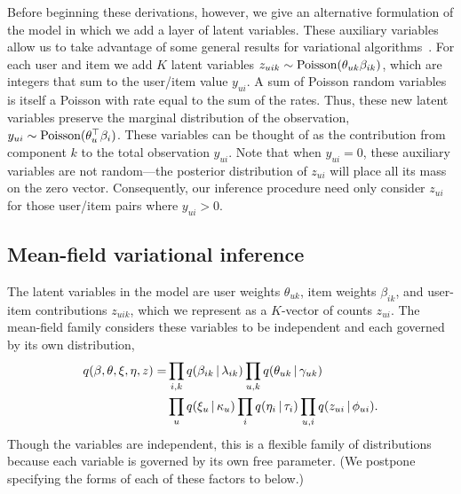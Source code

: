 \documentclass{sig-alternate}
\begin{document}

Before beginning these derivations, however, we give an alternative
formulation of the model in which we add a layer of latent variables.
These auxiliary variables allow us to take advantage of some general
results for variational
algorithms~\cite{Ghahramani:2001,Hoffman:2013}.  For each user and
item we add $K$ latent variables $z_{uik} \sim \textrm{Poisson}(\theta_{uk}
\beta_{ik})$, which are integers that sum to the user/item value
$y_{ui}$.  A sum of Poisson random variables is itself a Poisson with
rate equal to the sum of the rates.  Thus, these new latent variables
preserve the marginal distribution of the observation, $y_{ui} \sim
\textrm{Poisson}(\theta_{u}^\top \beta_{i})$.  These variables can be thought
of as the contribution from component $k$ to the total observation
$y_{ui}$.  Note that when $y_{ui} = 0$, these auxiliary variables are
not random---the posterior distribution of $z_{ui}$ will place all its
mass on the zero vector.  Consequently, our inference procedure need
only consider $z_{ui}$ for those user/item pairs where $y_{ui} > 0$.

\subsection{Mean-field variational inference} The latent variables in
the model are user weights $\theta_{uk}$, item weights $\beta_{ik}$,
and user-item contributions $z_{uik}$, which we represent as a
$K$-vector of counts $z_{ui}$.  The mean-field family considers these
variables to be independent and each governed by its own distribution,
\begin{align}
  \label{eq:q}
  q(\beta, \theta, \xi, \eta, z) =& \prod_{i,k} q(\beta_{ik} \,\vert\, \lambda_{ik})
  \prod_{u,k} q(\theta_{uk} \,\vert\, \gamma_{uk}) \nonumber\\ 
  & \prod_{u} q(\xi_u \,\vert\, \kappa_u) \prod_{i} q(\eta_i \,\vert\, \tau_i)
  \prod_{u,i} q(z_{ui} \,\vert\, \phi_{ui}).
\end{align}
Though the variables are independent, this is a flexible family of
distributions because each variable is governed by its own free
parameter.  (We postpone specifying the forms of each of these factors
to below.)
\end{document}
